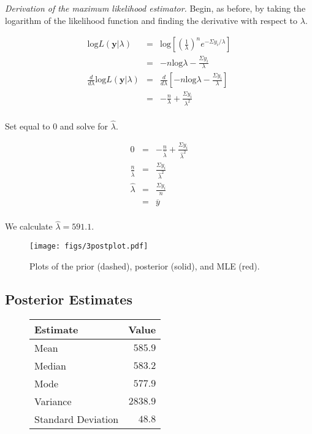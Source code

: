 \documentclass[12pt]{article}
\newcommand{\ybar}{\overline{y}}
\begin{document}
\noindent \emph{Derivation of the maximum likelihood estimator.} Begin, as before, by taking the logarithm of the likelihood function and finding the derivative with respect to $\lambda$.

\begin{eqnarray*}
\mathrm{log}L(\mathbf{y}|\lambda) &=& \mathrm{log}\left[\left(\frac{1}{\lambda}\right)^ne^{-\Sigma y_i/\lambda}\right] \\
&=& -n\mathrm{log}\lambda-\frac{\Sigma y_i}{\lambda} \\
\frac{d}{d\lambda}\mathrm{log}L(\mathbf{y}|\lambda) &=& \frac{d}{d\lambda}\left[-n\mathrm{log}\lambda-\frac{\Sigma y_i}{\lambda}\right] \\
&=& -\frac{n}{\lambda}+\frac{\Sigma y_i}{\lambda^2} \\
\end{eqnarray*}

\noindent Set equal to 0 and solve for $\hat{\lambda}$.

\begin{eqnarray*}
0 &=& -\frac{n}{\hat{\lambda}}+\frac{\Sigma y_i}{\hat{\lambda}^2} \\
\frac{n}{\hat{\lambda}} &=& \frac{\Sigma y_i}{\hat{\lambda}^2} \\
\hat{\lambda} &=& \frac{\Sigma y_i}{n} \\
&=& \ybar \\
\end{eqnarray*}

\noindent We calculate $\hat{\lambda}=591.1$.

\begin{figure}[H]
\begin{center}
\texttt{[image: figs/3postplot.pdf]}
\caption{Plots of the prior (dashed), posterior (solid), and MLE (red).}
\end{center}
\end{figure}

\subsection{Posterior Estimates}


\begin{figure}[H]
\begin{center}
\begin{tabular}{l|r}
Estimate & \multicolumn{1}{l}{Value} \\ \hline \hline
Mean               & $585.9$ \\
Median             & $583.2$ \\
Mode               & $577.9$ \\
Variance           & $2838.9$ \\
Standard Deviation & $48.8$ \\
\end{tabular}
\end{center}
\end{figure}
\end{document}

